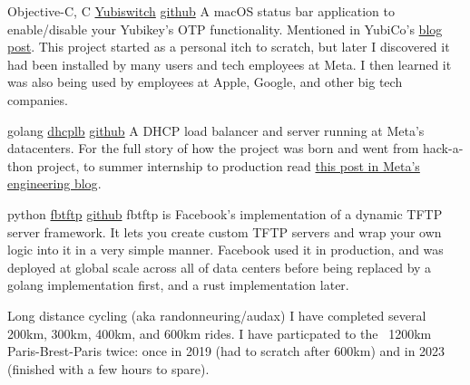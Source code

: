 
\begin{cventries}

  \cventry
  {Objective-C, C}
  {\href{https://github.com/pallotron/yubiswitch}{Yubiswitch}}
  {\href{https://github.com/pallotron/yubiswitch}{github}}
  {}
  {
    A macOS status bar application to enable/disable your Yubikey's OTP functionality.
    Mentioned in YubiCo's \href{https://www.yubico.com/blog/yubiswitch/}{blog post}.
    This project started as a personal itch to scratch, but later I discovered it had
    been installed by many users and tech employees at Meta.
    I then learned it was also being used by employees at Apple, Google, and other big
    tech companies.
  }

  \cventry
  {golang}
  {\href{https://github.com/facebookincubator/dhcplb}{dhcplb}}
  {\href{https://github.com/facebookincubator/dhcplb}{github}}
  {}
  {
    A DHCP load balancer and server running at Meta's datacenters.
    For the full story of how the project was born and went from hack-a-thon project, to
    summer internship to production read \href{https://engineering.fb.com/2016/09/13/data-infrastructure/dhcplb-an-open-source-load-balancer/}{this post in Meta's engineering blog}.
  }

  \cventry
  {python}
  {\href{https://github.com/facebookarchive/fbtftp}{fbtftp}}
  {\href{https://github.com/facebookarchive/fbtftp}{github}}
  {}
  {
    fbtftp is Facebook's implementation of a dynamic TFTP server framework. It lets you create custom TFTP servers and wrap your
    own logic into it in a very simple manner. Facebook used it in production, and was deployed at global scale
    across all of data centers before being replaced by a golang implementation first, and a rust implementation later.
  }

\end{cventries}


\begin{cventries}
  \cventry
  {}
  {Long distance cycling (aka randonneuring/audax)}
  {}
  {}
  {
    I have completed several 200km, 300km, 400km, and 600km rides.
    I have particpated to the ~1200km Paris-Brest-Paris twice: once in 2019 (had to scratch after 600km)
    and in 2023 (finished with a few hours to spare).
  }
\end{cventries}